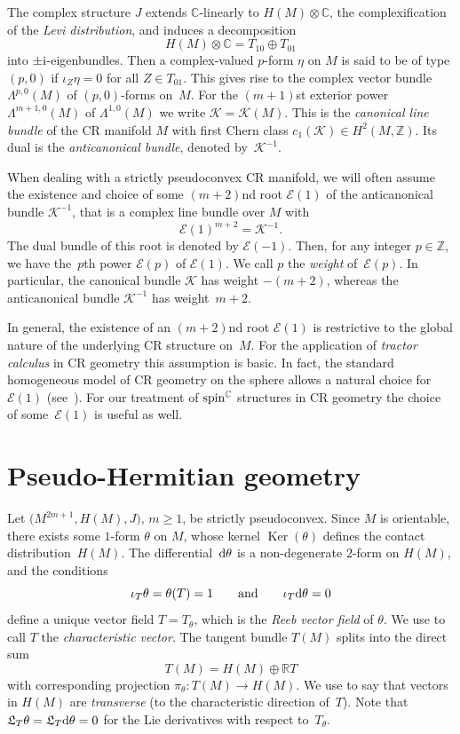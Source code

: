\documentclass[10pt,a4paper]{amsart}
\numberwithin{equation}{section}
\newcommand{\RR}{\mathbb{R}}
\newcommand{\ZZ}{\mathbb{Z}}
\newcommand{\CC}{\mathbb{C}}
\begin{document}
The complex structure $J$ extends $\CC$-linearly to $H(M)\otimes\CC$, the complexification of the {\em Levi distribution}, and induces a decomposition
\[
H(M)\otimes\CC = T_{10}\oplus T_{01}
\]
into $\pm {\rm i}$-eigenbundles. Then a complex-valued $p$-form $\eta$ on $M$ is said to be of type $(p,0)$ if $\iota_Z\eta=0$ for all $Z\in T_{01}$.
This gives rise to the complex vector bundle $\Lambda^{p,0}(M)$ of $(p,0)$-forms on~$M$.
For the $(m+1)$st exterior power $\Lambda^{m+1,0}(M)$ of $\Lambda^{1,0}(M)$ we write $\mathcal{K}=\mathcal{K}(M)$.
This is the {\em canonical line bundle} of the CR manifold $M$ with first Chern class $c_1(\mathcal{K})\in H^2(M,\ZZ)$.
Its dual is the {\em anticanonical bundle}, denoted by~$\mathcal{K}^{-1}$.

When dealing with a strictly pseudoconvex CR manifold, we will often assume the existence and choice
of some $(m+2)$nd root $\mathcal{E}(1)$ of the anticanonical bundle $\mathcal{K}^{-1}$,
that is a complex line bundle over $M$ with
\[
\mathcal{E}(1)^{m+2} =\mathcal{K}^{-1} .
\]
The dual bundle of this root is denoted by $\mathcal{E}(-1)$. Then, for any integer $p\in\ZZ$, we have the~$p$th power $\mathcal{E}(p)$
of $\mathcal{E}(1)$. We call $p$ the {\em weight} of~$\mathcal{E}(p)$.
In particular, the canonical bundle $\mathcal{K}$ has weight $-(m+2)$, whereas
the anticanonical bundle $\mathcal{K}^{-1}$ has weight~$m+2$.

In general, the existence of an $(m+2)$nd root $\mathcal{E}(1)$ is restrictive to the global nature of the underlying CR structure on~$M$.
For the application of {\em tractor calculus} in CR geometry this assumption is basic.
In fact, the standard homogeneous model of CR geometry on the sphere allows a natural choice for $\mathcal{E}(1)$ (see~\cite{CG1}).
For our treatment of ${\rm spin}^\CC$ structures in CR geometry the choice of some~$\mathcal{E}(1)$ is useful as well.

\section{Pseudo-Hermitian geometry} \label{Sec3}

Let $\big(M^{2m+1}, H(M), J\big)$, $m\geq 1$, be strictly pseudoconvex.
Since $M$ is orientable, there exists some $1$-form $\theta$ on $M$, whose kernel $\operatorname{Ker}(\theta)$
defines the contact distribution~$H(M)$. The differen\-tial~${\rm d}\theta$ is a non-degenerate $2$-form on $H(M)$, and
the conditions \[ \iota_T\theta=\theta(T)=1\qquad\mbox{and}\qquad \iota_T{\rm d}\theta=0\]
define a unique vector field $T=T_\theta$, which is the {\em Reeb vector field} of $\theta$.
We use to call $T$ the {\em characteristic vector}. The tangent
bundle $T(M)$ splits into the direct sum
\[T(M) = H(M) \oplus \RR T\]
with corresponding projection $\pi_\theta\colon T(M)\to H(M)$. We use to say that vectors in $H(M)$ are {\em transverse}
(to the characteristic direction of~$T$).
Note that $\mathfrak{L}_T\theta=\mathfrak{L}_T{\rm d}\theta=0$ for the Lie derivatives
with respect to~$T_\theta$.
\end{document}
